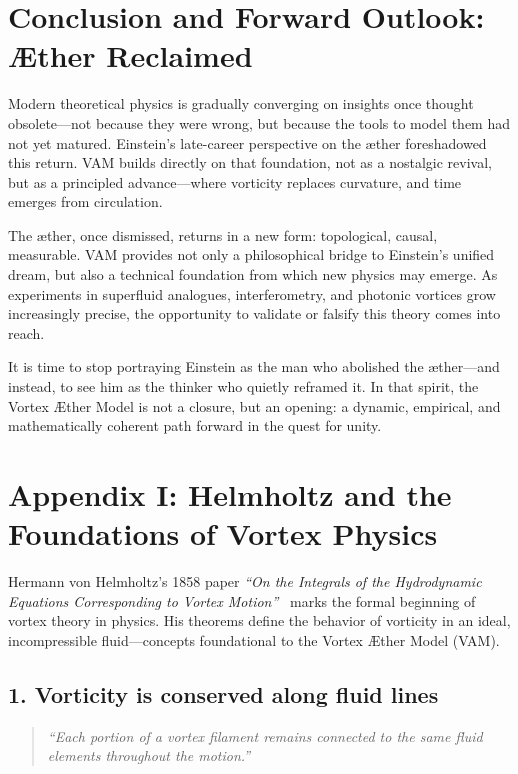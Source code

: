 \documentclass[preprint,notitlepage]{revtex4-2}
\begin{document}
\section*{Conclusion and Forward Outlook: Æther Reclaimed}

Modern theoretical physics is gradually converging on insights once thought obsolete—not because they were wrong, but because the tools to model them had not yet matured. Einstein’s late-career perspective on the æther foreshadowed this return. VAM builds directly on that foundation, not as a nostalgic revival, but as a principled advance—where vorticity replaces curvature, and time emerges from circulation.

The æther, once dismissed, returns in a new form: topological, causal, measurable. VAM provides not only a philosophical bridge to Einstein’s unified dream, but also a technical foundation from which new physics may emerge. As experiments in superfluid analogues, interferometry, and photonic vortices grow increasingly precise, the opportunity to validate or falsify this theory comes into reach.

It is time to stop portraying Einstein as the man who abolished the æther—and instead, to see him as the thinker who quietly reframed it. In that spirit, the Vortex Æther Model is not a closure, but an opening: a dynamic, empirical, and mathematically coherent path forward in the quest for unity.


\appendix
\section*{Appendix I: Helmholtz and the Foundations of Vortex Physics}
\label{appendix:helmholtz}

    Hermann von Helmholtz’s 1858 paper \textit{“On the Integrals of the Hydrodynamic Equations Corresponding to Vortex Motion”}~\cite{helmholtz1858vortices} marks the formal beginning of vortex theory in physics. His theorems define the behavior of vorticity in an ideal, incompressible fluid—concepts foundational to the Vortex Æther Model (VAM).

    \subsection*{1. Vorticity is conserved along fluid lines}
    \begin{quote}
    \textit{“Each portion of a vortex filament remains connected to the same fluid elements throughout the motion.”}
    \end{quote}
\end{document}
